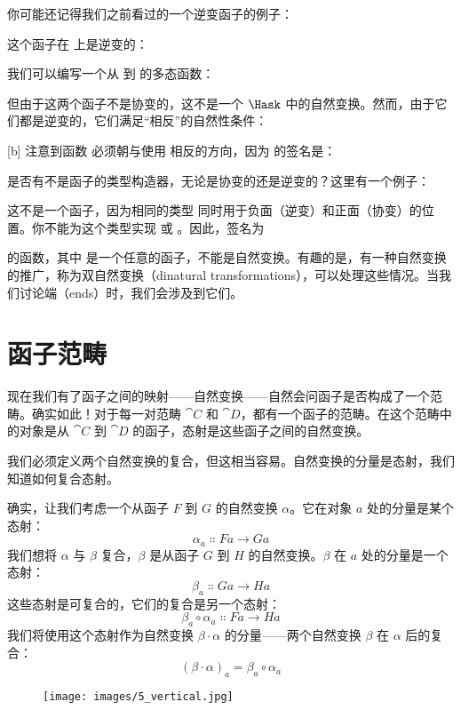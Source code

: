 你可能还记得我们之前看过的一个逆变函子的例子：

这个函子在  上是逆变的：

我们可以编写一个从  到  的多态函数：

但由于这两个函子不是协变的，这不是一个 $\Hask$ 中的自然变换。然而，由于它们都是逆变的，它们满足“相反”的自然性条件：

[b]
注意到函数  必须朝与使用  相反的方向，因为  的签名是：

是否有不是函子的类型构造器，无论是协变的还是逆变的？这里有一个例子：

这不是一个函子，因为相同的类型  同时用于负面（逆变）和正面（协变）的位置。你不能为这个类型实现  或 。因此，签名为

的函数，其中  是一个任意的函子，不能是自然变换。有趣的是，有一种自然变换的推广，称为双自然变换（dinatural transformations），可以处理这些情况。当我们讨论端（ends）时，我们会涉及到它们。

\section{函子范畴}

现在我们有了函子之间的映射——自然变换——自然会问函子是否构成了一个范畴。确实如此！对于每一对范畴 $\cat{C}$ 和 $\cat{D}$，都有一个函子的范畴。在这个范畴中的对象是从 $\cat{C}$ 到 $\cat{D}$ 的函子，态射是这些函子之间的自然变换。

我们必须定义两个自然变换的复合，但这相当容易。自然变换的分量是态射，我们知道如何复合态射。

确实，让我们考虑一个从函子 $F$ 到 $G$ 的自然变换 $\alpha$。它在对象 $a$ 处的分量是某个态射：
\[\alpha_a \Colon F a \to G a\]
我们想将 $\alpha$ 与 $\beta$ 复合，$\beta$ 是从函子 $G$ 到 $H$ 的自然变换。$\beta$ 在 $a$ 处的分量是一个态射：
\[\beta_a \Colon G a \to H a\]
这些态射是可复合的，它们的复合是另一个态射：
\[\beta_a \circ \alpha_a \Colon F a \to H a\]
我们将使用这个态射作为自然变换 $\beta \cdot \alpha$ 的分量——两个自然变换 $\beta$ 在 $\alpha$ 后的复合：
\[(\beta \cdot \alpha)_a = \beta_a \circ \alpha_a\]

\begin{figure}[H]
  \centering
  \texttt{[image: images/5\_vertical.jpg]}
\end{figure}


